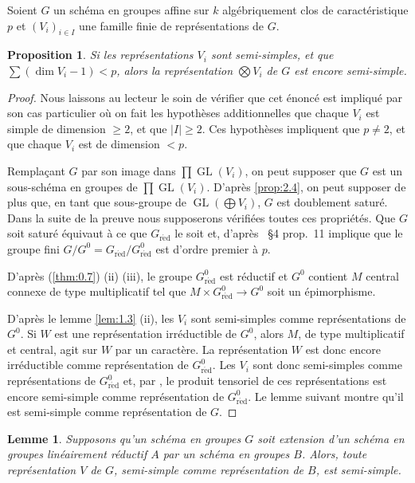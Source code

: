 \documentclass[11pt,a4paper]{article}
\theoremstyle{plain}
\newtheorem{lemma}[theorem]{Lemme}
\newtheorem{proposition}[theorem]{Proposition}
\theoremstyle{definition}
\DeclareMathOperator{\GL}{GL}
\newcommand{\red}{\mathrm{r\acute{e}d}}
\begin{document}
Soient $G$ un sch\'ema en groupes affine sur $k$ alg\'ebriquement clos de caract\'eristique $p$ et $(V_i)_{i \in I}$ une famille finie de repr\'esentations de $G$.

\begin{proposition}\label{prop:3.1}
Si les repr\'esentations $V_i$ sont semi-simples, et que $\sum (\dim V_i - 1) < p$, alors la repr\'esentation $\bigotimes V_i$ de $G$ est encore semi-simple.
\end{proposition}

\begin{proof}
Nous laissons au lecteur le soin de v\'erifier que cet \'enonc\'e est impliqu\'e par son cas particulier o\`u on fait les hypoth\`eses additionnelles que chaque $V_i$ est simple de dimension $\geq 2$, et que $|I| \geq 2$. Ces hypoth\`eses impliquent que $p \neq 2$, et que chaque $V_i$ est de dimension $< p$.

Rempla\c{c}ant $G$ par son image dans $\prod \GL(V_i)$, on peut supposer que $G$ est un sous-sch\'ema en groupes de $\prod \GL(V_i)$. D'apr\`es \ref{prop:2.4}, on peut supposer de plus que, en tant que sous-groupe de $\GL(\bigoplus V_i)$, $G$ est doublement satur\'e. Dans la suite de la preuve nous supposerons v\'erifi\'ees toutes ces propri\'et\'es. Que $G$ soit satur\'e \'equivaut \`a ce que $G_\red$ le soit et, d'apr\`es \cite{Serre1994}~\S4 prop.~11 implique que le groupe fini $G/G^0 = G_\red/G^0_\red$ est d'ordre premier \`a $p$.

D'apr\`es (\ref{thm:0.7}) (ii) (iii), le groupe $G^0_\red$ est r\'eductif et $G^0$ contient $M$ central connexe de type multiplicatif tel que $M \times G^0_\red \to G^0$ soit un \'epimorphisme.

D'apr\`es le lemme \ref{lem:1.3} (ii), les $V_i$ sont semi-simples comme repr\'esentations de $G^0$. Si $W$ est une repr\'esentation irr\'eductible de $G^0$, alors $M$, de type multiplicatif et central, agit sur $W$ par un caract\`ere. La repr\'esentation $W$ est donc encore irr\'eductible comme repr\'esentation de $G^0_\red$. Les $V_i$ sont donc semi-simples comme repr\'esentations de $G^0_\red$ et, par \cite{Serre1994}, le produit tensoriel de ces repr\'esentations est encore semi-simple comme repr\'esentation de $G^0_\red$. Le lemme suivant montre qu'il est semi-simple comme repr\'esentation de $G$.
\end{proof}

\begin{lemma}\label{lem:3.2}
Supposons qu'un sch\'ema en groupes $G$ soit extension d'un sch\'ema en groupes lin\'eairement r\'eductif $A$ par un sch\'ema en groupes $B$. Alors, toute repr\'esentation $V$ de $G$, semi-simple comme repr\'esentation de $B$, est semi-simple.
\end{lemma}
\end{document}
